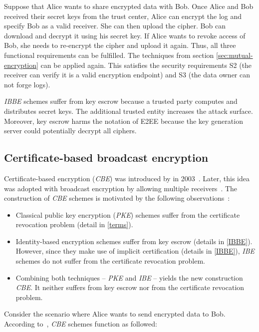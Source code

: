 \documentclass[../main.tex]{subfiles}
\begin{document}
Suppose that Alice wants to share encrypted data with Bob.
Once Alice and Bob received their secret keys from the trust center, Alice can encrypt the log and specify Bob as a valid receiver.
She can then upload the cipher.
Bob can download and decrypt it using his secret key.
If Alice wants to revoke access of Bob, she needs to re-encrypt the cipher and upload it again.
Thus, all three functional requirements can be fulfilled.
The techniques from section \ref{sec:mutual-encryption} can be applied again.
This satisfies the security requirements S2 (the receiver can verify it is a valid encryption endpoint) and S3 (the data owner can not forge logs).

\textit{IBBE} schemes suffer from key escrow because a trusted party computes and distributes secret keys.
The additional trusted entity increases the attack surface.
Moreover, key escrow harms the notation of E2EE because the key generation server could potentially decrypt all ciphers.

\subsection{Certificate-based broadcast encryption}
Certificate-based encryption (\textit{CBE}) was introduced by \citeauthor{Gentry2003} in 2003~\cite{Gentry2003}. 
Later, this idea was adopted with broadcast encryption by allowing multiple receivers~\cite{Li2018, Fan2013}.
The construction of \textit{CBE} schemes is motivated by the following observations~\cite{Gentry2003}:

\begin{itemize}
    \item Classical public key encryption (\textit{PKE}) schemes suffer from the certificate revocation problem (detail in \cref{terms}).
    \item Identity-based encryption schemes suffer from key escrow (details in \cref{IBBE}).
    However, since they make use of implicit certification (details in \cref{IBBE}), \textit{IBE} schemes do not suffer from the certificate revocation problem.
    \item Combining both techniques -- \textit{PKE} and \textit{IBE} -- yields the new construction \textit{CBE}. 
    It neither suffers from key escrow nor from the certificate revocation problem.
\end{itemize}

Consider the scenario where Alice wants to send encrypted data to Bob. 
According to~\cite{Gentry2003}, \textit{CBE} schemes function as followed:
\end{document}

